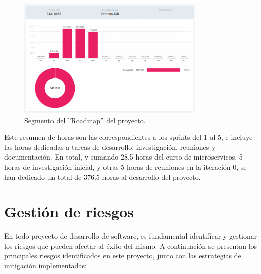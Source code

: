 \begin{figure}[H] 
    \centering 
    \includegraphics[width=0.8\textwidth]{figures/05_clockify.png}
    \caption{Segmento del ''Roadmap'' del proyecto.} %
    \label{clockify} %
\end{figure}

Este resumen de horas son las correspondientes a los sprints del 1 al 5, e incluye las horas dedicadas a tareas de desarrollo, investigación, reuniones y documentación. En total, y sumando 28.5 horas del curso de microservicos, 5 horas de investigación inicial, y otras 5 horas de reuniones en la iteración 0, se han dedicado un total de 376.5 horas al desarrollo del proyecto.

\section{Gestión de riesgos}

En todo proyecto de desarrollo de software, es fundamental identificar y gestionar los riesgos que pueden afectar al éxito del mismo. A continuación se presentan los principales riesgos identificados en este proyecto, junto con las estrategias de mitigación implementadas:

